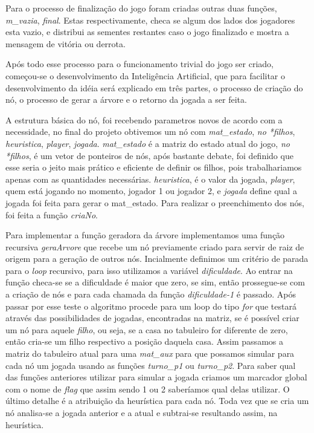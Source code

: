 \documentclass[a4paper, 12pt]{article}
\begin{document}
		Para o processo de finalização do jogo foram criadas outras duas funções, \emph{m\_vazia}, \emph{final}. Estas respectivamente, checa se algum dos lados dos jogadores esta vazio, e distribui as sementes restantes caso o jogo finalizado e mostra a mensagem de vitória ou derrota.

		Após todo esse processo para o funcionamento trivial do jogo ser criado, começou-se o desenvolvimento da Inteligência Artificial, que para facilitar o desenvolvimento da idéia será explicado em três partes, o processo de criação do nó, o processo de gerar a árvore e o retorno da jogada a ser feita.

		A estrutura básica do nó, foi recebendo parametros novos de acordo com a necessidade, no final do projeto obtivemos um nó com \emph{mat\_estado}, \emph{no *filhos}, \emph{heuristica}, \emph{player}, \emph{jogada}. \emph{mat\_estado} é a matriz do estado atual do jogo, \emph{no *filhos}, é um vetor de ponteiros de nós, após bastante debate, foi definido que esse seria o jeito mais prático e eficiente de definir os filhos, pois trabalhariamos apenas com as quantidades necessárias. \emph{heuristica}, é o valor da jogada, \emph{player}, quem está jogando no momento, jogador 1 ou jogador 2, e \emph{jogada} define qual a jogada foi feita para gerar o mat\_estado. Para realizar o preenchimento dos nós, foi feita a função \emph{criaNo}.

		Para implementar a função geradora da árvore implementamos uma função recursiva \emph{geraArvore} que recebe um nó previamente criado para servir de raiz de origem para a geração de outros nós. Incialmente definimos um critério de parada para o \emph{loop} recursivo, para isso utilizamos a variável \emph{dificuldade}. Ao entrar na função checa-se se a dificuldade é maior que zero, se sim, então prossegue-se com a criação de nós e para cada chamada da função \emph{dificuldade-1} é passado. Após passar por esse teste o algoritmo procede para um loop do tipo \emph{for} que testará através das possibilidades de jogadas, encontradas na matriz, se é possível criar um nó para aquele \emph{filho}, ou seja, se a casa no tabuleiro for diferente de zero, então cria-se um filho respectivo a posição daquela casa. Assim passamos a matriz do tabuleiro atual para uma \emph{mat\_aux} para que possamos simular para cada nó um jogada usando as funções \emph{turno\_p1} ou \emph{turno\_p2}. Para saber qual das funções anteriores utilizar para simular a jogada criamos um marcador global com o nome de \emph{flag} que assim sendo 1 ou 2 saberíamos qual delas utilizar. O último detalhe é a atribuição da heurística para cada nó. Toda vez que se cria um nó analisa-se a jogada anterior e a atual e subtrai-se resultando assim, na heurística.
\end{document}
